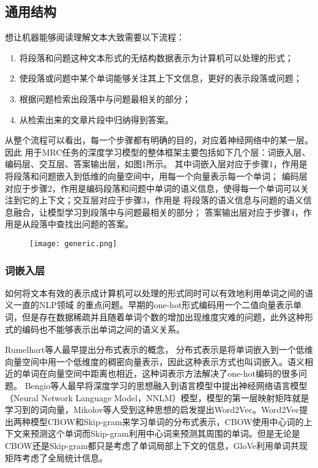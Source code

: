 \subsection{通用结构}
想让机器能够阅读理解文本大致需要以下流程：
\begin{enumerate}
	\item 将段落和问题这种文本形式的无结构数据表示为计算机可以处理的形式；
	\item 使段落或问题中某个单词能够关注其上下文信息，更好的表示段落或问题；
	\item 根据问题检索出段落中与问题最相关的部分；
	\item 从检索出来的文章片段中归纳得到答案。
\end{enumerate}
从整个流程可以看出，每一个步骤都有明确的目的，对应着神经网络中的某一层。因此
用于MRC任务的深度学习模型的整体框架主要包括如下几个层：词嵌入层、编码层、交互层、答案输出层，如图1所示。
其中词嵌入层对应于步骤1，作用是将段落和问题嵌入到低维的向量空间中，用每一个向量表示每一个单词；
编码层对应于步骤2，作用是编码段落和问题中单词的语义信息，使得每一个单词可以关注到它的上下文；交互层对应于步骤3，作用是
将段落的语义信息与问题的语义信息融合，让模型学习到段落中与问题最相关的部分；
答案输出层对应于步骤4，作用是从段落中查找出问题的答案。
\begin{figure}
	\centering
	\texttt{[image: generic.png]}
\end{figure}

\subsubsection{词嵌入层}
如何将文本有效的表示成计算机可以处理的形式同时可以有效地利用单词之间的语义一直的NLP领域
的重点问题。早期的one-hot形式编码用一个二值向量表示单词，但是存在数据稀疏并且随着单词个数的增加出现维度灾难的问题，此外这种形式的编码也不能够表示出单词之间的语义关系。

Rumelhart等人最早提出分布式表示的概念，
分布式表示是将单词嵌入到一个低维向量空间中用一个低维度的稠密向量表示，因此这种表示方式也叫词嵌入。语义相近的单词在向量空间中距离也相近，这种词表示方法解决了one-hot编码的很多问题。
Bengio等人最早将深度学习的思想融入到语言模型中提出神经网络语言模型（Neural Network Language Model，NNLM）模型，模型的第一层映射矩阵就是学习到的词向量，Mikolov等人受到这种思想的启发提出Word2Vec。Word2Vec提出两种模型CBOW和Skip-gram来学习单词的分布式表示，CBOW使用中心词的上下文来预测这个单词而Skip-gram利用中心词来预测其周围的单词。但是无论是CBOW还是Skip-gram都只是考虑了单词局部上下文的信息，GloVe利用单词共现矩阵考虑了全局统计信息。


